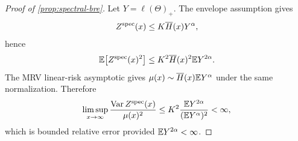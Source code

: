 \begin{proof}[Proof of \cref{prop:spectral-bre}]
Let \(Y=\ell(\Theta)_+\). The envelope assumption gives
\[
  Z^{\mathrm{spec}}(x)\le K\overline{H}(x)Y^\alpha,
\]
hence
\[
  \mathbb{E}\!\left[Z^{\mathrm{spec}}(x)^2\right]
  \le K^2\overline{H}(x)^2\mathbb{E} Y^{2\alpha}.
\]
The MRV linear-risk asymptotic gives \(\mu(x)\sim \overline{H}(x)\mathbb{E} Y^\alpha\) under the
same normalization. Therefore
\[
  \limsup_{x\to\infty}\frac{\operatorname{Var} Z^{\mathrm{spec}}(x)}{\mu(x)^2}
  \le K^2\frac{\mathbb{E} Y^{2\alpha}}{(\mathbb{E} Y^\alpha)^2}<\infty,
\]
which is bounded relative error provided \(\mathbb{E} Y^{2\alpha}<\infty\).
\end{proof}
